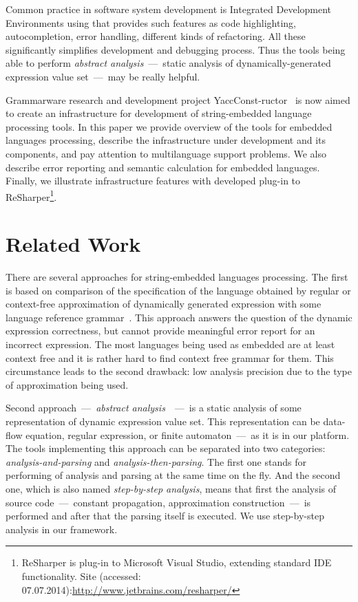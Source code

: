 \documentclass{acm_proc_article-sp}
\begin{document}
Common practice in software system development is Integrated Development Environments using that provides such features as code highlighting, autocompletion, error handling, different kinds of refactoring. All these significantly simplifies development and debugging process. Thus the tools being able to perform {\it abstract analysis}~---~static analysis of dynamically-generated expression value set~---~may be really helpful.

Grammarware research and development project YaccConst-ructor~\cite{GrigorevKirilenkoYC} is now aimed to create an infrastructure for development of string-embedded language processing tools. In this paper we provide overview of the tools for embedded languages processing, describe the infrastructure under development and its components, and pay attention to multilanguage support problems. We also describe error reporting and semantic calculation for embedded languages. Finally, we illustrate infrastructure features with developed plug-in to ReSharper\footnote{ReSharper is plug-in to Microsoft Visual Studio, extending standard IDE functionality. Site (accessed: 07.07.2014):\url{http://www.jetbrains.com/resharper/}}. 


\section{Related Work}

There are several approaches for string-embedded languages processing. The first is based on comparison of the specification of the language obtained by regular or context-free approximation of dynamically generated expression with some language reference grammar~\cite{Minamide, StringExpr}. This approach answers the question of the dynamic expression correctness, but cannot provide meaningful error report for an incorrect expression. The most languages being used as embedded are at least context free and it is rather hard to find context free grammar for them. This circumstance leads to the second drawback: low analysis precision due to the type of approximation being used.

Second approach~---~{\it abstract analysis}~\cite{LRAbstrParsing}~---~is a static analysis of some representation of dynamic expression value set. This representation can be data-flow equation, regular expression, or finite automaton~---~as it is in our platform. The tools implementing this approach can be separated into two categories: {\it analysis-and-parsing} and {\it analysis-then-parsing}. The first one stands for performing of analysis and parsing at the same time on the fly. And the second one, which is also named {\it step-by-step analysis}, means that first the analysis of source code~---~constant propagation, approximation construction~---~is performed and after that the parsing itself is executed. We use step-by-step analysis in our framework.
\end{document}

